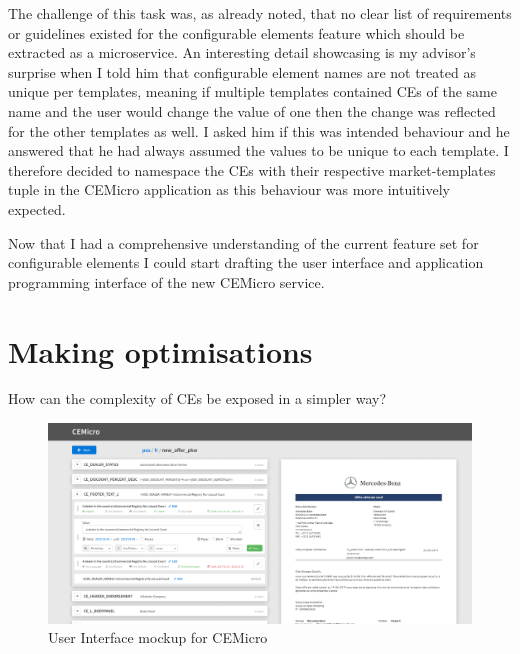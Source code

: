The challenge of this task was, as already noted, that no clear list of requirements or guidelines existed for the configurable elements feature which should be extracted as a microservice. An interesting detail showcasing is my advisor's surprise when I told him that configurable element names are not treated as unique per templates, meaning if multiple templates contained CEs of the same name and the user would change the value of one then the change was reflected for the other templates as well. I asked him if this was intended behaviour and he answered that he had always assumed the values to be unique to each template. I therefore decided to namespace the CEs with their respective market-templates tuple in the CEMicro application as this behaviour was more intuitively expected.

Now that I had a comprehensive understanding of the current feature set for configurable elements I could start drafting the user interface and application programming interface of the new CEMicro service.


\section{Making optimisations}

How can the complexity of CEs be exposed in a simpler way?

\begin{figure}
  \centering
  \includegraphics[width=\linewidth]{assets/cemicro-ui-mockup.png}
  \caption{User Interface mockup for CEMicro}
  \label{fig:mockup}
\end{figure}
